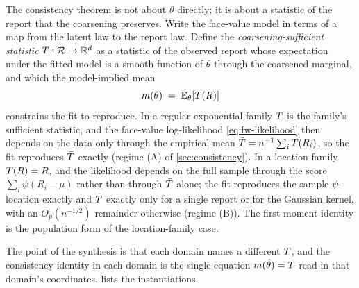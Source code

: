 The consistency theorem is not about $\theta$ directly; it is about a
statistic of the report that the coarsening preserves. Write the
face-value model in terms of a map from the latent law to the report
law. Define the \emph{coarsening-sufficient statistic} $T :
\mathcal{R} \to \mathbb{R}^d$ as a statistic of the observed report whose
expectation under the fitted model is a smooth function of $\theta$
through the coarsened marginal, and which the model-implied mean
\begin{equation}
  m(\theta) \;=\; \mathbb{E}_\theta[T(R)]
  \label{eq:fw-implied-mean}
\end{equation}
constrains the fit to reproduce. In a regular exponential family $T$
is the family's sufficient statistic, and the face-value log-likelihood
\eqref{eq:fw-likelihood} then depends on the data only through the
empirical mean $\bar{T} = n^{-1}\sum_i T(R_i)$, so the fit reproduces
$\bar{T}$ exactly (regime (A) of \cref{sec:consistency}). In a location
family $T(R) = R$, and the likelihood depends on the full sample
through the score $\sum_i \psi(R_i - \mu)$ rather than through $\bar{T}$
alone; the fit reproduces the sample $\psi$-location exactly and $\bar{T}$
exactly only for a single report or for the Gaussian kernel, with an
$O_p(n^{-1/2})$ remainder otherwise (regime (B)). The
\citet{towell2026dpcoarsening} first-moment identity is the population
form of the location-family case.

The point of the synthesis is that each domain names a different $T$,
and the consistency identity in each domain is the single equation
$m(\hat\theta) = \bar{T}$ read in that domain's coordinates.
 lists the instantiations.


